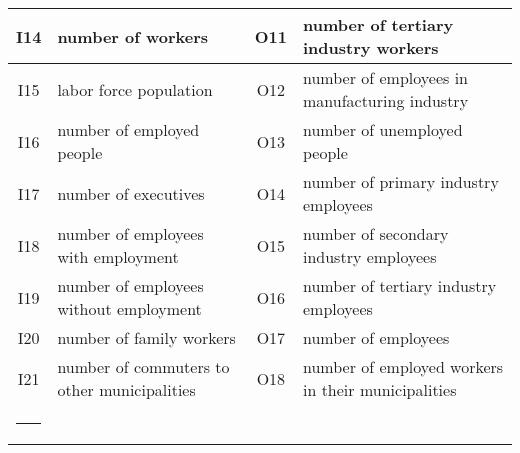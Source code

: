 \documentclass[12pt]{article} %
\makeatletter
\def\Hline{%
\noalign{\ifnum0=`}\fi\hrule \@height 2pt \futurelet
\reserved@a\@xhline}
\makeatother
\begin{document}
\begin{table}[h]
\begin{tabular}{c|p{5cm}||c|p{5cm}}
    I14 & \parbox{5cm}{\strut{}number of workers\strut} & 
	O11 & \parbox{5cm}{number of tertiary industry workers\strut} \\ \hline
    I15 & \parbox{5cm}{\strut{}labor force population\strut} & 
	O12 & \parbox{5cm}{number of employees in manufacturing industry\strut} \\ \hline
    I16 & \parbox{5cm}{\strut{}number of employed people\strut} & 
	O13 & \parbox{5cm}{number of unemployed people\strut} \\ \hline
    I17 & \parbox{5cm}{\strut{}number of executives\strut} & 
	O14 & \parbox{5cm}{number of primary industry employees\strut} \\ \hline
    I18 & \parbox{5cm}{\strut{}number of employees with employment\strut} & 
	O15 & \parbox{5cm}{number of secondary industry employees\strut} \\ \hline
    I19 & \parbox{5cm}{\strut{}number of employees without employment\strut} & 
	O16 & \parbox{5cm}{number of tertiary industry employees\strut} \\ \hline
    I20 & \parbox{5cm}{\strut{}number of family workers\strut} & 
	O17 & \parbox{5cm}{number of employees\strut} \\ \hline
    I21 & \parbox{5cm}{\strut{}number of commuters to other municipalities\strut} & 
	O18 & \parbox{5cm}{number of employed workers in their municipalities\strut} \\ \Hline
  \end{tabular}
\label{tab:notationsdata}
\end{table}
\end{document}
